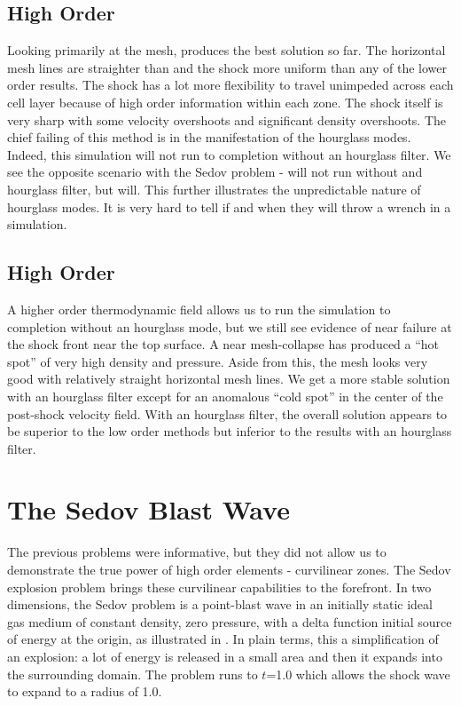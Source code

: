 \subsection{High Order \texorpdfstring{}{Q2-Q1}}
Looking primarily at the mesh,  produces the best solution so far. The horizontal mesh lines are straighter than and the shock more uniform than any of the lower order results. The shock has a lot more flexibility to travel unimpeded across each cell layer because of high order information within each zone. The shock itself is very sharp with some velocity overshoots and significant density overshoots. The chief failing of this method is in the manifestation of the hourglass modes. Indeed, this simulation will not run to completion without an hourglass filter. We see the opposite scenario with the Sedov problem -  will not run without and hourglass filter, but  will. This further illustrates the unpredictable nature of hourglass modes. It is very hard to tell if and when they will throw a wrench in a simulation. 


\subsection{High Order \texorpdfstring{}{Q2-Q2}}
A higher order thermodynamic field allows us to run the simulation to completion without an hourglass mode, but we still see evidence of near failure at the shock front near the top surface. A near mesh-collapse has produced a ``hot spot'' of very high density and pressure. Aside from this, the mesh looks very good with relatively straight horizontal mesh lines. We get a more stable solution with an hourglass filter except for an anomalous ``cold spot'' in the center of the post-shock velocity field. With an hourglass filter, the overall solution appears to be superior to the low order methods but inferior to the  results with an hourglass filter. 


\section{The Sedov Blast Wave}
The previous problems were informative, but they did not allow us to demonstrate the true power of high order elements - curvilinear zones. The Sedov explosion problem \cite{Sedov59} brings these curvilinear capabilities to the forefront. In two dimensions, the Sedov problem is a point-blast wave in an initially static ideal gas medium of constant density, zero pressure, with a delta function initial source of energy at the origin, as illustrated in . In plain terms, this a simplification of an explosion: a lot of energy is released in a small area and then it expands into the surrounding domain. The problem runs to $t$=1.0 which allows the shock wave to expand to a radius of 1.0.

